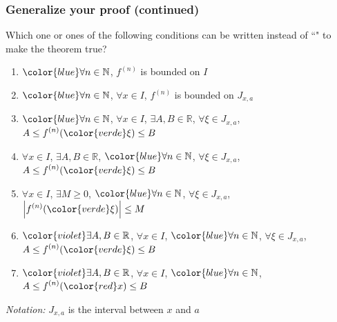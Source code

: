 \begin{frame}[t]
	\fontsize{12}{12}\selectfont
	\frametitle{Generalize your proof (continued)}

	Which one or ones of the following conditions can be written instead of ``"
	to make the theorem true?
	\vspace{.2cm}
	\begin{enumerate}
		\item $\displaystyle{\color{blue} \forall n \in \mathbb{N}}$, \;
			$\displaystyle f^{(n)}$ is bounded on $I$
			\vspace{.2cm}

		\item $\displaystyle{\color{blue} \forall n \in \mathbb{N}}$, \;
			{\color{red} $\displaystyle \forall x \in I$}, \; $\displaystyle f^{(n)}$ is
			bounded on $J_{x,a}$
			\vspace{.2cm}

		\item $\displaystyle{\color{blue} \forall n \in \mathbb{N}}$, \;
			{\color{red} $\displaystyle \forall x \in I$}, \; {\color{violet} $\displaystyle \exists A, B \in \mathbb{R}$},
			\; {\color{verde} $\displaystyle \forall \xi \in J_{x,a}$}, \; $\displaystyle
			A \leq f^{(n)}({\color{verde} \xi}) \leq B$
			\vspace{.2cm}

		\item {\color{red} $\displaystyle \forall x \in I$}, \;
			{\color{violet} $\displaystyle \exists A, B \in \mathbb{R}$}, \; $\displaystyle
			{\color{blue} \forall n \in \mathbb{N}}$, \;
			{\color{verde} $\displaystyle \forall \xi \in J_{x,a}$}, \; $\displaystyle
			A \leq f^{(n)}({\color{verde} \xi}) \leq B$
			\vspace{.2cm}

		\item {\color{red} $\displaystyle \forall x \in I$}, \;
			{\color{violet} $\displaystyle \exists M \geq 0$}, \; $\displaystyle{\color{blue} \forall n \in \mathbb{N}}$,
			\; {\color{verde} $\displaystyle \forall \xi \in J_{x,a}$}, \; $\displaystyle
			\left\vert f^{(n)}({\color{verde} \xi}) \right\vert \leq M$
			\vspace{.2cm}

		\item $\displaystyle{\color{violet} \exists A, B \in \mathbb{R}}$, \;
			{\color{red} $\displaystyle \forall x \in I$}, \; $\displaystyle{\color{blue} \forall n \in \mathbb{N}}$,
			\; {\color{verde} $\displaystyle \forall \xi \in J_{x,a}$}, \; $\displaystyle
			A \leq f^{(n)}({\color{verde} \xi}) \leq B$
			\vspace{.2cm}

		\item $\displaystyle{\color{violet} \exists A, B \in \mathbb{R}}$, \;
			{\color{red} $\displaystyle \forall x \in I$}, \; $\displaystyle{\color{blue} \forall n \in \mathbb{N}}$,
			\; $\displaystyle A \leq f^{(n)}({\color{red} x}) \leq B$
	\end{enumerate}
	\vspace{.5cm}

	\emph{Notation:} $\displaystyle J_{x,a}$ is the interval between $x$ and $a$
\end{frame}

